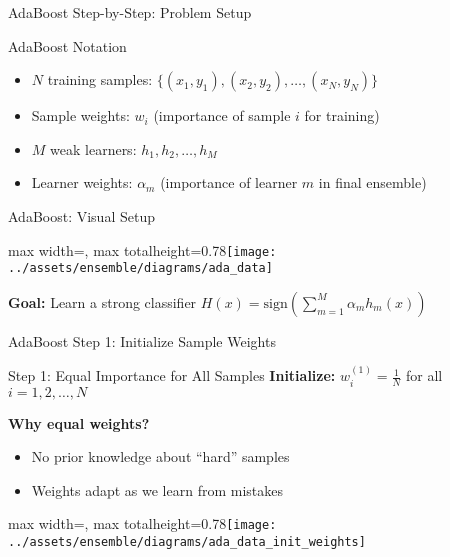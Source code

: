 \documentclass[10pt]{beamer}
\newcommand{\fitpic}[1]{\begin{adjustbox}{max width=\linewidth, max totalheight=0.78\textheight}#1\end{adjustbox}}
\begin{document}
\begin{frame}{AdaBoost Step-by-Step: Problem Setup}
\begin{definitionbox}{AdaBoost Notation}
\begin{itemize}
\item $N$ training samples: $\{(x_1, y_1), (x_2, y_2), \ldots, (x_N, y_N)\}$
\item Sample weights: $w_i$ (importance of sample $i$ for training)
\item $M$ weak learners: $h_1, h_2, \ldots, h_M$
\item Learner weights: $\alpha_m$ (importance of learner $m$ in final ensemble)
\end{itemize}
\end{definitionbox}
\end{frame}

\begin{frame}{AdaBoost: Visual Setup}
  \vspace{0.3cm}
  \centering
  \fitpic{\texttt{[image: ../assets/ensemble/diagrams/ada\_data]}}

\begin{keypointsbox}
\textbf{Goal:} Learn a strong classifier $H(x) = \text{sign}\left(\sum_{m=1}^M \alpha_m h_m(x)\right)$
\end{keypointsbox}
\end{frame}

\begin{frame}{AdaBoost Step 1: Initialize Sample Weights}
\begin{alertbox}{Step 1: Equal Importance for All Samples}
\textbf{Initialize:} $w_i^{(1)} = \frac{1}{N}$ for all $i = 1, 2, \ldots, N$
\end{alertbox}

\textbf{Why equal weights?}
\begin{itemize}
\item No prior knowledge about ``hard'' samples
\item Weights adapt as we learn from mistakes
\end{itemize}

  \vspace{0.3cm}
  \centering
  \fitpic{\texttt{[image: ../assets/ensemble/diagrams/ada\_data\_init\_weights]}}
\end{frame}
\end{document}
